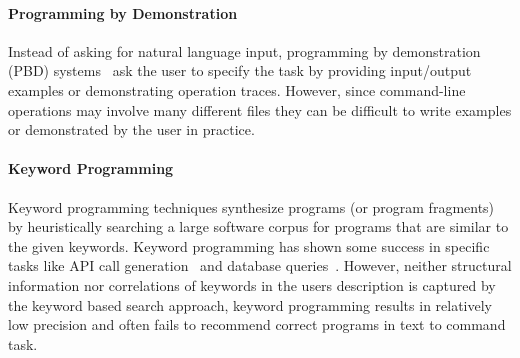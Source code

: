 \paragraph{Programming by Demonstration} Instead of asking for natural language input, programming by demonstration (PBD) systems~\cite{DBLP:journals/ml/LauWDW03, DBLP:journals/cacm/GulwaniHS12, DBLP:conf/pldi/HarrisG11, DBLP:conf/popl/Gulwani11} ask the user to specify the task by providing input/output examples or demonstrating operation traces. However, since command-line operations may involve many different files they can be difficult to write examples or demonstrated by the user in practice.

\paragraph{Keyword Programming} Keyword programming techniques synthesize programs (or program fragments) by heuristically searching a large software corpus for programs that are similar to the given keywords. Keyword programming has shown some success in specific tasks like API call generation~\cite{DBLP:journals/ase/LittleM09, DBLP:conf/pldi/MandelinXBK05} and database queries~\cite{DBLP:conf/icde/AgrawalCD02, DBLP:conf/icde/BhalotiaHNCS02}. However, neither structural information nor correlations of keywords in the users description is captured by the keyword based search approach, keyword programming results in relatively low precision and often fails to recommend correct programs in text to command task.
